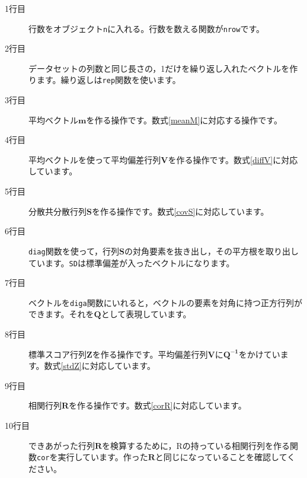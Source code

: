 \begin{description}
	\item[1行目] 行数をオブジェクト\texttt{n}に入れる。行数を数える関数が\texttt{nrow}です。
	\item[2行目] データセットの列数と同じ長さの，1だけを繰り返し入れたベクトルを作ります。繰り返しは\texttt{rep}関数を使います。
	\item[3行目] 平均ベクトル$\bm{m}$を作る操作です。数式\ref{meanM}に対応する操作です。
	\item[4行目] 平均ベクトルを使って平均偏差行列$\bm{V}$を作る操作です。数式\ref{diffV}に対応しています。
	\item[5行目] 分散共分散行列$\bm{S}$を作る操作です。数式\ref{covS}に対応しています。
	\item[6行目] \texttt{diag}関数を使って，行列$\bm{S}$の対角要素を抜き出し，その平方根を取り出しています。\texttt{SD}は標準偏差が入ったベクトルになります。
	\item[7行目] ベクトルを\texttt{diga}関数にいれると，ベクトルの要素を対角に持つ正方行列ができます。それを$\bm{Q}$として表現しています。
	\item[8行目] 標準スコア行列$\bm{Z}$を作る操作です。平均偏差行列$\bm{V}$に$\bm{Q^{-1}}$をかけています。数式\ref{stdZ}に対応しています。
	\item[9行目] 相関行列$\bm{R}$を作る操作です。数式\ref{corR}に対応しています。
	\item[10行目] できあがった行列$\bm{R}$を検算するために，Rの持っている相関行列を作る関数\texttt{cor}を実行しています。作った$\bm{R}$と同じになっていることを確認してください。
\end{description}
